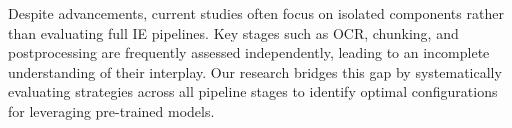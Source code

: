 Despite advancements, current studies often focus on isolated components rather than evaluating full IE pipelines. Key stages such as OCR, chunking, and postprocessing are frequently assessed independently, leading to an incomplete understanding of their interplay. Our research bridges this gap by systematically evaluating strategies across all pipeline stages to identify optimal configurations for leveraging pre-trained models.